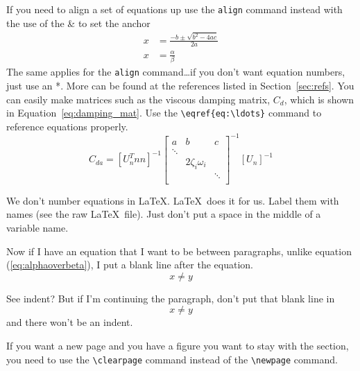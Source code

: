 \documentclass[12pt]{report}
\begin{document}
If you need to align a set of equations up use the \verb'align' command instead with the use of the \& to set the anchor
\begin{align}
x&=\frac{-b\pm\sqrt{b^2-4ac}}{2a}\\
x&=\frac{\alpha}{\beta}
\end{align}
The same applies for the \verb'align' command\ldots if you don\rq{}t want equation numbers,  just use an *.  More can be found at the references listed in Section~\ref{sec:refs}.  You can easily make matrices such as the viscous damping matrix, $C_d$, which is shown in Equation~\eqref{eq:damping_mat}.  Use the \verb'\eqref{eq:\ldots}' command to reference equations properly.
%
\begin{equation}
\label{eq:damping_mat}
C_{da} =[U_n^Tnn]^{-1}
\left[ \begin{array}{ccc}
a&b&c\\
	\ddots & 				& \\
	     	& 2 \zeta_i \omega_i 		& \\
		&				& \ddots \\
\end{array} \right]^{{-1}} [U_n]^{-1}
\end{equation}

We don't number equations in \LaTeX. \LaTeX\ does it for us. Label them with names (see the raw \LaTeX\ file).   Just don't put a space in the middle of a variable name.

Now if I have an equation that I want to be between paragraphs, unlike equation (\ref{eq:alphaoverbeta}), I put a blank line after the equation.
\begin{equation}
  \label{eq:anothersillyequation}
  x\neq y
\end{equation}

See  indent? But if I'm continuing the paragraph, don't put that blank line in
\begin{equation}
  \label{eq:anothersillyequation2}
  x\neq y
\end{equation}
and there won\rq{}t be an indent.

If you want a new page and you have a figure you want to stay with the section, you need to use the \verb'\clearpage' command instead of the \verb'\newpage' command.

\end{document}
